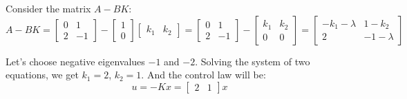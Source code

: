 Consider the matrix \( A-BK \):
\[
A-BK = \begin{bmatrix}0 & 1 \\ 2 & -1\end{bmatrix} - \begin{bmatrix}1 \\ 0\end{bmatrix}\begin{bmatrix}k_1 & k_2\end{bmatrix} = \begin{bmatrix}0 & 1 \\ 2 & -1\end{bmatrix} - \begin{bmatrix}k_1 & k_2 \\ 0 & 0\end{bmatrix} = \begin{bmatrix}-k_1 - \lambda & 1-k_2 \\ 2 & -1-\lambda\end{bmatrix}
\]

Let's choose negative eigenvalues \( -1 \) and \( -2 \).
Solving the system of two equations, we get \( k_1 = 2 \), \( k_2 = 1 \).
And the control law will be:
\[
u = - Kx = \begin{bmatrix}2 & 1\end{bmatrix}x
\]
